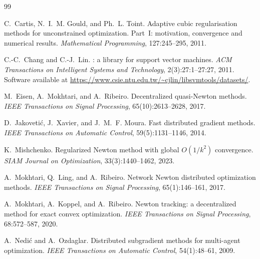 \documentclass[11pt,a4paper]{article}
\begin{document}

	\begin{thebibliography}{99}
		
		C.~Cartis, N.~I.~M. Gould, and Ph.~L. Toint.
		\newblock Adaptive cubic regularisation methods for unconstrained optimization. Part~I: motivation, convergence and numerical results.
		\newblock \emph{Mathematical Programming}, 127:245--295, 2011.
		
		C.-C.~Chang and C.-J.~Lin.
		: a library for support vector machines.
		\newblock \emph{ACM Transactions on Intelligent Systems and Technology}, 2(3):27:1--27:27, 2011.
		\newblock Software available at \url{https://www.csie.ntu.edu.tw/~cjlin/libsvmtools/datasets/}.
		
		M.~Eisen, A.~Mokhtari, and A.~Ribeiro.
		\newblock Decentralized quasi-{N}ewton methods.
		\newblock \emph{IEEE Transactions on Signal Processing}, 65(10):2613--2628, 2017.
		
		D.~Jakoveti{\'c}, J.~Xavier, and J.~M.~F. Moura.
		\newblock Fast distributed gradient methods.
		\newblock \emph{IEEE Transactions on Automatic Control}, 59(5):1131--1146, 2014.
		
		K.~Mishchenko.
		\newblock Regularized {N}ewton method with global $O(1/k^2)$ convergence.
		\newblock \emph{SIAM Journal on Optimization}, 33(3):1440--1462, 2023.
		
		A.~Mokhtari, Q.~Ling, and A.~Ribeiro.
		\newblock Network {N}ewton distributed optimization methods.
		\newblock \emph{IEEE Transactions on Signal Processing}, 65(1):146--161, 2017.
		
		A.~Mokhtari, A.~Koppel, and A.~Ribeiro.
		\newblock Newton tracking: a decentralized method for exact convex optimization.
		\newblock \emph{IEEE Transactions on Signal Processing}, 68:572--587, 2020.
		
		A.~Nedi{\'c} and A.~Ozdaglar.
		\newblock Distributed subgradient methods for multi-agent optimization.
		\newblock \emph{IEEE Transactions on Automatic Control}, 54(1):48--61, 2009.
		

\end{thebibliography}
\end{document}
